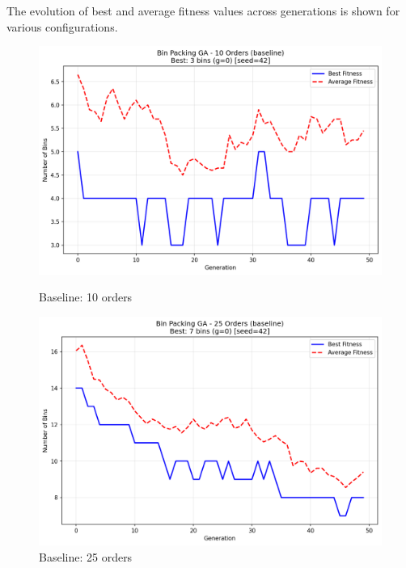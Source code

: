\documentclass[journal,12pt,onecolumn]{IEEEtran}
\begin{document}
The evolution of best and average fitness values across generations is shown for various configurations.

\begin{figure}[htbp]
\begin{minipage}{0.48\textwidth}
    \centering
    \includegraphics[width=\textwidth]{bpp_10items_baseline_seed42.png}
    \caption{Baseline: 10 orders}
    \label{fig:baseline_10}
\end{minipage}\hfill
\begin{minipage}{0.48\textwidth}
    \centering
    \includegraphics[width=\textwidth]{bpp_25items_baseline_seed42.png}
    \caption{Baseline: 25 orders}
    \label{fig:baseline_25}
\end{minipage}
\end{figure}
\end{document}
